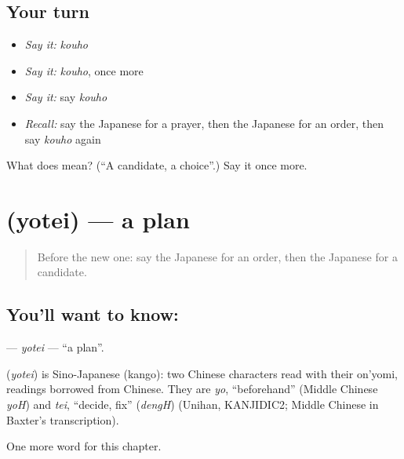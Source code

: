 \subsection*{Your turn}
\begin{itemize}
\raggedright
  \item \emph{Say it:} \emph{kouho}
  \item \emph{Say it:} \emph{kouho}, once more
  \item \emph{Say it:} say \emph{kouho}
  \item \emph{Recall:} say the Japanese for a prayer, then the Japanese for an order, then say \emph{kouho} again
\end{itemize}

\begin{tcolorbox}[breakable,colback=teal!4,colframe=teal!35!black,title={Before you move on}]
What does  mean? (\textquotedblleft{}A candidate, a choice\textquotedblright{}.) Say it once more.
\end{tcolorbox}
\section[\texorpdfstring{\ja{よてい} (yotei)}{よてい (yotei)}]{ (yotei) — a plan}

\label{lesson:JA-C93-yotei}



\begin{quote}
Before the new one: say the Japanese for an order, then the Japanese for a candidate.
\end{quote}

\subsection*{You'll want to know: }
\textbf{} — \emph{yotei} — \textquotedblleft{}a plan\textquotedblright{}.

\begin{cousinweb}
\textbf{} (\emph{yotei}) is Sino-Japanese (kango): two Chinese characters read with their on'yomi, readings borrowed from Chinese. They are \emph{yo}, \textquotedblleft{}beforehand\textquotedblright{} (Middle Chinese \emph{yoH}) and \emph{tei}, \textquotedblleft{}decide, fix\textquotedblright{} (\emph{dengH}) (Unihan, KANJIDIC2; Middle Chinese in Baxter's transcription).
\end{cousinweb}

\begin{grammarlens}[title={What you've built}]
One more word for this chapter.
\end{grammarlens}

